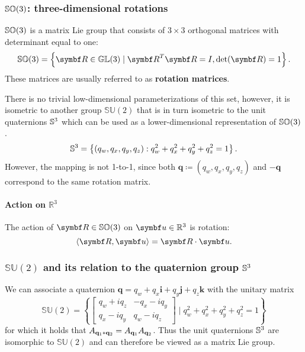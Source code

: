 \subsubsection{${\mathbb{SO}(3)}$: three-dimensional rotations}

${\mathbb{SO}(3)}$ is a matrix Lie group that consists of $3 \times 3$ orthogonal matrices with determinant equal to one:
\begin{equation}
  \SOthree = \left\{ \bR \in \mathbb{GL}(3) \mid \bR^T \bR = I, \det(\bR) = 1  \right\}.
\end{equation}
These matrices are usually referred to as \textbf{rotation matrices}.

There is no trivial low-dimensional parameterizations of this set, however, it is isometric to another group $\mathbb{SU}(2)$ that is in turn isometric to the unit quaternions ${\mathbb{S}^3}$ which can be used as a lower-dimensional representation of ${\mathbb{SO}(3)}$.
\begin{equation}
  {\mathbb{S}^3} = \left \{ (q_w, q_x, q_y, q_z)  : q_w^2 + q_x^2 + q_y^2 + q_z^2 = 1 \right\}.
\end{equation}
However, the mapping is not 1-to-1, since both $\symbf{q} \coloneq (q_w, q_x, q_y, q_z)$ and $-\symbf{q}$ correspond to the same rotation matrix.


\paragraph{Action on $\mathbb{R}^3$}

The action of $\bR \in \SOthree$ on $\bu \in \mathbb{R}^3$ is rotation:
\begin{equation}
  \left \langle \bR, \bu \right \rangle = \bR \cdot \bu.
\end{equation}



\subsubsection{$\mathbb{SU}(2)$ and its relation to the quaternion group ${\mathbb{S}^3}$}

We can associate a quaternion $\symbf{q} = q_w + q_x \symbf{i} + q_y \symbf{j} + q_z \symbf{k}$ with the unitary matrix
\begin{equation}
  \label{eq:su2_matrix}
  \mathbb{SU}(2) = \left\{ \begin{bmatrix}
    q_w + i q_z & -q_x - i q_y \\
    q_x - i q_y & q_w - i q_z
  \end{bmatrix} \mid q_w^2 + q_x^2 + q_y^2 + q_z^2 = 1 \right\}
\end{equation}
for which it holds that $A_{\mathbf{q}_1 * \mathbf{q}_2} = A_{\mathbf{q}_1} A_{\mathbf{q}_2}$. Thus the unit quaternions ${\mathbb{S}^3}$ are isomorphic to $\mathbb{SU}(2)$ and can therefore be viewed as a matrix Lie group.

